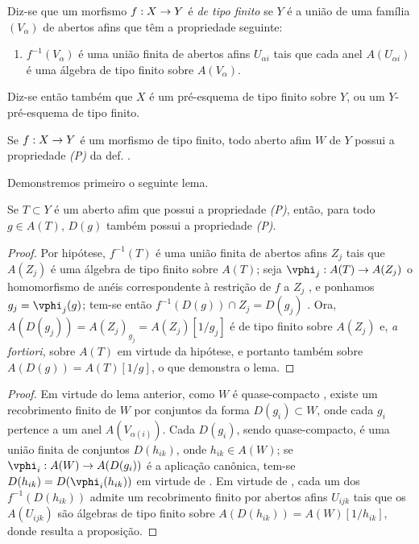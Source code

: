 \documentclass[oneside]{amsart}
\makeatletter
\newcommand{\ega@arrow}[2]{\mathchoice{#1}{#2}{#2}{#2}}
\renewcommand{\to}{\ega@arrow{\longrightarrow}{\rightarrow}}
\let\EGAOriginalLabel\label
\renewcommand{\label}[1]{\phantomsection\EGAOriginalLabel{#1}}
\newcommand*{\ega@errmark}[1]{\textbf{Err}\textsubscript{#1}}
\newcommand{\erratum}[2][]{{#2}\marginpar{\footnotesize\ega@errmark{#1}}}
\makeatother
\begin{document}
\begin{definition}[6.3.1]
\label{I.6.3.1}
Diz-se que um morfismo $f:X\to Y$ é \emph{de tipo finito} se $Y$ é a união de uma família $(V_\alpha)$ de abertos afins que têm a propriedade seguinte:
\begin{enumerate}
  \item[(P)] $f^{-1}(V_\alpha)$ é uma união finita de abertos afins $U_{\alpha i}$ tais que cada anel $A(U_{\alpha i})$ é uma álgebra de tipo finito sobre $A(V_\alpha)$.
\end{enumerate}
Diz-se então também que $X$ é um pré-esquema de tipo finito sobre $Y$, ou um $Y$-pré-esquema de tipo finito.
\end{definition}

\begin{proposition}[6.3.2]
\label{I.6.3.2}
Se $f:X\to Y$ é um morfismo de tipo finito, todo aberto afim $W$ de $Y$ possui a propriedade \emph{(P)} da def. .
\end{proposition}

Demonstremos primeiro o seguinte lema.
\begin{lemma}[6.3.2.1]
\label{I.6.3.2.1}
Se $T\subset Y$ é um aberto afim que possui a propriedade \emph{(P)}, então, para todo $g\in A(T)$, $D(g)$ também possui a propriedade \emph{(P)}.
\end{lemma}

\begin{proof}
Por hipótese, $f^{-1}(T)$ é uma união finita de abertos afins $Z_j$ tais que $A(Z_j)$ é uma álgebra de tipo finito sobre $A(T)$;
seja $\vphi_j:A(T)\to A(Z_j)$ o homomorfismo de anéis correspondente à restrição de $f$ a $Z_j$ , e ponhamos $g_j=\vphi_j(g)$;
tem-se então $f^{-1}(D(g))\cap Z_j=D(g_j)$ .
Ora, $A(D(g_j))=A(Z_j)_{g_j}=A(Z_j)[1/g_j]$ é de tipo finito sobre $A(Z_j)$ e, \emph{a fortiori}, sobre $A(T)$ em virtude da hipótese, e portanto também sobre $A(D(g))=A(T)[1/g]$, o que demonstra o lema.
\end{proof}

\begin{proof}
Em virtude do lema anterior, como $W$ é quase-compacto , existe um recobrimento finito de $W$ por conjuntos da forma \erratum[II]{$D(g_i)\subset W$}, onde cada $g_i$ pertence a um anel $A(V_{\alpha(i)})$.
Cada $D(g_i)$, sendo quase-compacto, é uma união finita de conjuntos $D(h_{ik})$, onde $h_{ik}\in A(W)$;
se $\vphi_i:A(W)\to A(D(g_i))$ é a aplicação canônica, tem-se $D(h_{ik})=D(\vphi_i(h_{ik}))$ em virtude de .
Em virtude de , cada um dos $f^{-1}(D(h_{ik}))$ admite um recobrimento finito por abertos afins $U_{ijk}$ tais que os $A(U_{ijk})$ são álgebras de tipo finito sobre $A(D(h_{ik}))=A(W)[1/h_{ik}]$, donde resulta a proposição.
\end{proof}
\end{document}
